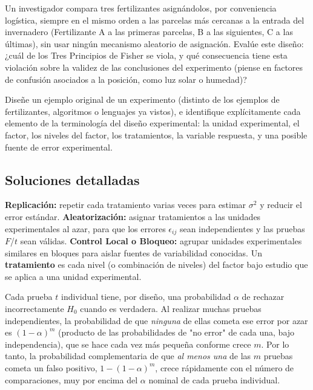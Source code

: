 \begin{problema}
	\label{prob:257933a}
	Un investigador compara tres fertilizantes asignándolos, por conveniencia logística, siempre en el mismo orden a las parcelas más cercanas a la entrada del invernadero (Fertilizante A a las primeras parcelas, B a las siguientes, C a las últimas), sin usar ningún mecanismo aleatorio de asignación. Evalúe este diseño: ¿cuál de los Tres Principios de Fisher se viola, y qué consecuencia tiene esta violación sobre la validez de las conclusiones del experimento (piense en factores de confusión asociados a la posición, como luz solar o humedad)?
\end{problema}

\begin{problema}
	\label{prob:fb4917f}
	Diseñe un ejemplo original de un experimento (distinto de los ejemplos de fertilizantes, algoritmos o lenguajes ya vistos), e identifique explícitamente cada elemento de la terminología del diseño experimental: la unidad experimental, el factor, los niveles del factor, los tratamientos, la variable respuesta, y una posible fuente de error experimental.
\end{problema}

\subsection*{Soluciones detalladas}

\begin{solproblema}[prob:8d16ad2]
	\textbf{Replicación:} repetir cada tratamiento varias veces para estimar $\sigma^2$ y reducir el error estándar. \textbf{Aleatorización:} asignar tratamientos a las unidades experimentales al azar, para que los errores $\epsilon_{ij}$ sean independientes y las pruebas $F$/$t$ sean válidas. \textbf{Control Local o Bloqueo:} agrupar unidades experimentales similares en bloques para aislar fuentes de variabilidad conocidas. Un \textbf{tratamiento} es cada nivel (o combinación de niveles) del factor bajo estudio que se aplica a una unidad experimental.
\end{solproblema}

\begin{solproblema}[prob:0b5e19a]
	Cada prueba $t$ individual tiene, por diseño, una probabilidad $\alpha$ de rechazar incorrectamente $H_0$ cuando es verdadera. Al realizar muchas pruebas independientes, la probabilidad de que \emph{ninguna} de ellas cometa ese error por azar es $(1-\alpha)^m$ (producto de las probabilidades de "no error" de cada una, bajo independencia), que se hace cada vez más pequeña conforme crece $m$. Por lo tanto, la probabilidad complementaria de que \emph{al menos una} de las $m$ pruebas cometa un falso positivo, $1-(1-\alpha)^m$, crece rápidamente con el número de comparaciones, muy por encima del $\alpha$ nominal de cada prueba individual.
\end{solproblema}

